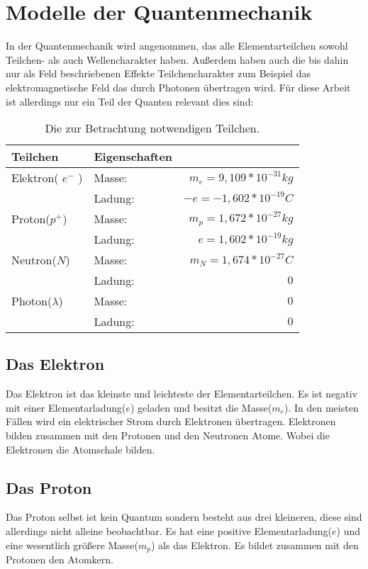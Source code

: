 \documentclass[11pt,a4paper,oneside]{report}
\begin{document}
\section{Modelle der Quantenmechanik}
In der Quantenmechanik wird angenommen, das alle Elementarteilchen sowohl Teilchen- als auch Wellencharakter haben. Außerdem haben auch die bis dahin nur als Feld beschriebenen Effekte Teilchencharakter zum Beispiel das elektromagnetische Feld das durch Photonen übertragen wird.
Für diese Arbeit ist allerdings nur ein Teil der Quanten relevant dies sind:
\begin{table}[h]
\centering
\begin{tabular}{|l|lr|} \hline
Teilchen 				& Eigenschaften 	&  						\\  \hline
Elektron( $e^-$ ) 		& Masse: 			& $m_e=9,109*10^{-31}kg$	\\
					& Ladung: 		& $-e=-1,602*10^{-19}C$	\\ \hline
Proton($p^+$) 		& Masse: 			& $m_p=1,672*10^{-27}kg$ 	\\
 					& Ladung: 		& $e=1,602*10^{-19}kg$	\\ \hline 
Neutron($N$)			& Masse:			& $m_N=1,674*10^{-27}C$	\\ 
					& Ladung:		& $0$					\\ \hline
Photon($ \lambda $) 	& Masse: 			& $0$					\\ 
					&Ladung:			& $0$					\\ \hline
\end{tabular}
\caption{Die zur Betrachtung notwendigen Teilchen.\cite[S. 433]{stroppe08}}
\end{table}

\subsection{Das Elektron}
Das Elektron ist das kleinste und leichteste der Elementarteilchen. Es ist negativ mit einer Elementarladung($e$) geladen und besitzt die Masse($m_e$). In den meisten Fällen wird ein elektrischer Strom durch Elektronen übertragen. Elektronen bilden zusammen mit den Protonen und den Neutronen Atome. Wobei die Elektronen die Atomschale bilden.
\\


\subsection{Das Proton}
Das Proton selbst ist kein Quantum sondern besteht aus drei kleineren, diese sind allerdings nicht alleine beobachtbar. Es hat eine positive Elementarladung($e$) und eine wesentlich größere Masse($m_p$) als das Elektron. Es bildet zusammen mit den Protonen den Atomkern.
\end{document}
